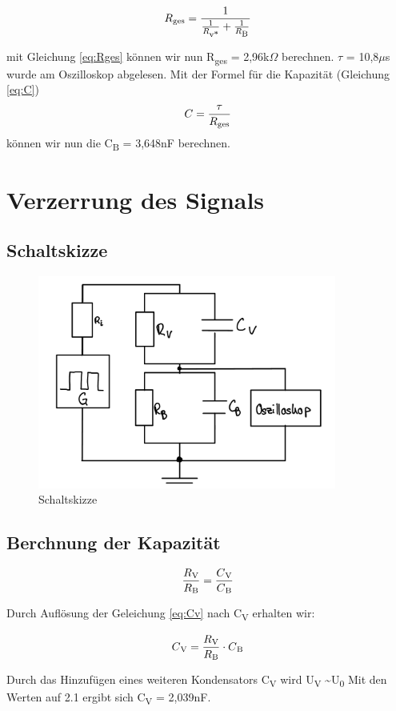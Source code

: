 \begin{equation}
	R\textsubscript{ges} = \frac{1}{\frac{1}{R\textsubscript{v*}} + 
	\frac{1}{R\textsubscript{B}}}
	\label{eq:Rges}
\end{equation}

mit Gleichung \ref*{eq:Rges} können wir nun R\textsubscript{ges} = 2,96k$\Omega$
berechnen.
$\tau$ = 10,8$\mu$s wurde am Oszilloskop abgelesen. Mit der Formel für die Kapazität
(Gleichung \ref*{eq:C})
\begin{equation}
	C = \frac{\tau}{R\textsubscript{ges}}
	\label{eq:C}
\end{equation}
können wir nun die C\textsubscript{B} = 3,648nF berechnen.


\section{Verzerrung des Signals}
\subsection*{Schaltskizze}

\begin{figure}[H]
	\centering
	\includegraphics[height=7cm]{images/Versuch2/2_Schaltungsskizze.jpeg} 
	\caption{Schaltskizze}
	\label{fig: Schaltungsskizze}
\end{figure}

\subsection*{Berchnung der Kapazität}

\begin{equation}
	\frac{R\textsubscript{V}}{R\textsubscript{B}} = \frac{C\textsubscript{V}}{C\textsubscript{B}}
	\label{eq:Cv}
\end{equation}

Durch Auflösung der Geleichung \ref*{eq:Cv} nach C\textsubscript{V}
erhalten wir: 

\begin{equation}
	C\textsubscript{V} = \frac{R\textsubscript{V}}{R\textsubscript{B}} \cdot C\textsubscript{B}
	\label{eq:Cv2}
\end{equation}

Durch das Hinzufügen eines weiteren Kondensators C\textsubscript{V} 
wird U\textsubscript{V} \textasciitilde U\textsubscript{0}
Mit den Werten auf 2.1 ergibt sich C\textsubscript{V} = 2,039nF.




